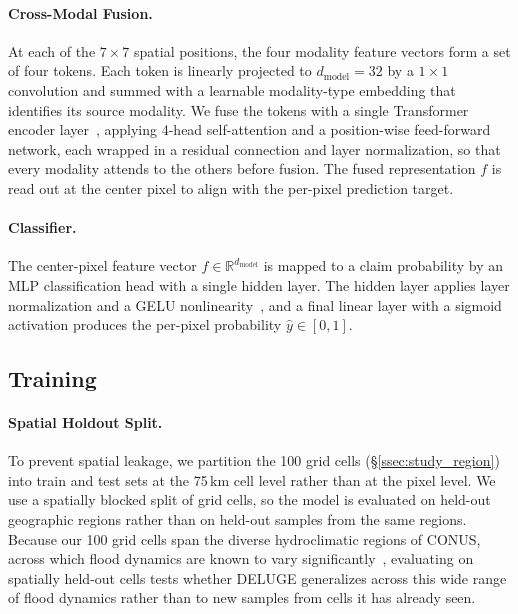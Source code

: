 \paragraph{Cross-Modal Fusion.}

At each of the $7 \times 7$ spatial positions, the four modality feature vectors form a set of four tokens.
%
Each token is linearly projected to $d_{\text{model}} = 32$ by a $1 \times 1$ convolution and summed with a learnable modality-type embedding that identifies its source modality.
%
We fuse the tokens with a single Transformer encoder layer~\cite{vaswani_attention_2017}, applying 4-head self-attention and a position-wise feed-forward network, each wrapped in a residual connection and layer normalization, so that every modality attends to the others before fusion.
%
The fused representation $f$ is read out at the center pixel to align with the per-pixel prediction target.

\paragraph{Classifier.}
\label{sec:arch-classifier}

The center-pixel feature vector $f \in \mathbb{R}^{d_{\text{model}}}$ is mapped to a claim probability by an MLP classification head with a single hidden layer.
%
The hidden layer applies layer normalization and a GELU nonlinearity~\cite{hendrycks_gaussian_2016}, and a final linear layer with a sigmoid activation produces the per-pixel probability $\hat{y} \in [0,1]$.

\subsection{Training}
\label{sec:arch-training}

\paragraph{Spatial Holdout Split.}
To prevent spatial leakage, we partition the 100 grid cells (\S\ref{ssec:study_region}) into train and test sets at the 75\,km cell level rather than at the pixel level.
%
We use a spatially blocked split of grid cells, so the model is evaluated on held-out geographic regions rather than on held-out samples from the same regions.
%
Because our 100 grid cells span the diverse hydroclimatic regions of CONUS, across which flood dynamics are known to vary significantly~\cite{brunner_spatial_2020}, evaluating on spatially held-out cells tests whether DELUGE generalizes across this wide range of flood dynamics rather than to new samples from cells it has already seen.

